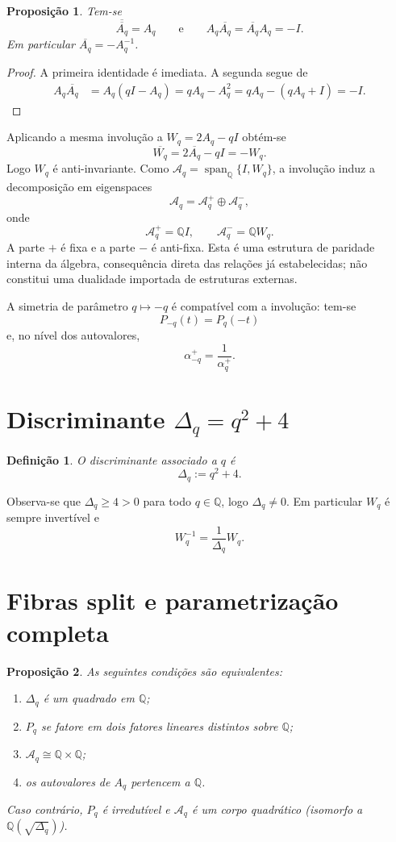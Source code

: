 \documentclass[11pt,a4paper]{article}
\newtheorem{definicao}{Definição}
\newtheorem{proposicao}{Proposição}
\begin{document}
\begin{proposicao}
Tem-se
\[
\overline{\overline{A_q}}=A_q
\qquad\text{e}\qquad
A_q\overline{A_q}=\overline{A_q}A_q=-I.
\]
Em particular \(\overline{A_q}=-A_q^{-1}\).
\end{proposicao}

\begin{proof}
A primeira identidade é imediata. A segunda segue de
\begin{align*}
A_q\overline{A_q}
&=A_q(qI-A_q)
=qA_q-A_q^2
=qA_q-(qA_q+I)
=-I.
\end{align*}
\end{proof}

Aplicando a mesma involução a \(W_q=2A_q-qI\) obtém-se
\[
\overline{W_q}=2\overline{A_q}-qI=-W_q.
\]
Logo \(W_q\) é anti-invariante. Como \(\mathcal{A}_q=\operatorname{span}_{\mathbb{Q}}\{I,W_q\}\), a involução induz a decomposição em eigenspaces
\[
\mathcal{A}_q=\mathcal{A}_q^+\oplus\mathcal{A}_q^-,
\]
onde
\[
\boxed{
\mathcal{A}_q^+=\mathbb{Q}I,
\qquad
\mathcal{A}_q^-=\mathbb{Q}W_q.
}
\]
A parte \(+\) é fixa e a parte \(-\) é anti-fixa. Esta é uma estrutura de paridade interna da álgebra, consequência direta das relações já estabelecidas; não constitui uma dualidade importada de estruturas externas.

A simetria de parâmetro \(q\mapsto-q\) é compatível com a involução: tem-se
\[
P_{-q}(t)=P_q(-t)
\]
e, no nível dos autovalores,
\[
\alpha_{-q}^+=\frac1{\alpha_q^+}.
\]

\section{Discriminante \(\Delta_q=q^2+4\)}

\begin{definicao}
O discriminante associado a \(q\) é
\[
\Delta_q:=q^2+4.
\]
\end{definicao}

Observa-se que \(\Delta_q\ge 4>0\) para todo \(q\in\mathbb{Q}\), logo
\(\Delta_q\neq 0\). Em particular \(W_q\) é sempre invertível e
\[
W_q^{-1}=\frac{1}{\Delta_q}W_q.
\]

\section{Fibras split e parametrização completa}

\begin{proposicao}
As seguintes condições são equivalentes:
\begin{enumerate}[label=(\roman*)]
\item \(\Delta_q\) é um quadrado em \(\mathbb{Q}\);
\item \(P_q\) se fatore em dois fatores lineares distintos sobre \(\mathbb{Q}\);
\item \(\mathcal{A}_q\cong\mathbb{Q}\times\mathbb{Q}\);
\item os autovalores de \(A_q\) pertencem a \(\mathbb{Q}\).
\end{enumerate}
Caso contrário, \(P_q\) é irredutível e \(\mathcal{A}_q\) é um corpo
quadrático (isomorfo a \(\mathbb{Q}(\sqrt{\Delta_q})\)).
\end{proposicao}
\end{document}
